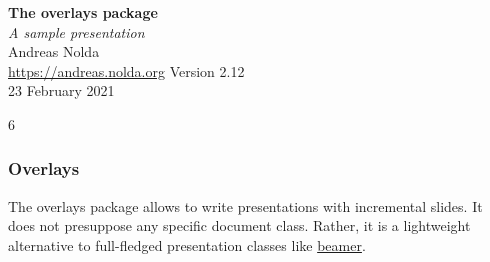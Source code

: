 \documentclass[fontsize=9pt,landscape,parskip=half]{scrartcl}
\begin{document}
\pagestyle{scrheadings}
\raggedright

\thispagestyle{empty}
\label{titlepage}
{\color{structure}%
{\Large \textbf{The \textrm{overlays} package} \\
\textit{A sample presentation}} \\[\baselineskip]
Andreas Nolda \\
\url{https://andreas.nolda.org}}\vfill
{\small Version 2.12 \\
23 February 2021}
\clearpage

\begin{fragileoverlays}{6}
\subsubsection*{Overlays}
The \textrm{overlays} package allows to write presentations with incremental
slides. It does not presuppose any specific document class. Rather, it is a
lightweight alternative to full-fledged presentation classes like
\href{http://www.ctan.org/pkg/beamer}{\textrm{beamer}}.


\begin{quote}
\begin{alltt}
\end{alltt}
\end{quote}

\end{fragileoverlays}
\clearpage

\end{document}
